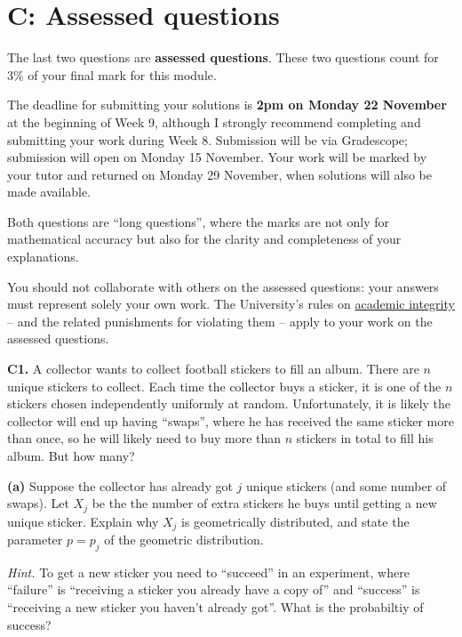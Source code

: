 \documentclass[
  a4paper,
]{book}
\theoremstyle{definition}
\theoremstyle{definition}
\theoremstyle{definition}
\theoremstyle{definition}
\theoremstyle{remark}
\begin{document}
\hypertarget{P4-assessed}{%
\section*{C: Assessed questions}\label{P4-assessed}}

The last two questions are \textbf{assessed questions}. These two questions count for 3\% of your final mark for this module.

The deadline for submitting your solutions is \textbf{2pm on Monday 22 November} at the beginning of Week 9, although I strongly recommend completing and submitting your work during Week 8. Submission will be via Gradescope; submission will open on Monday 15 November.
Your work will be marked by your tutor and returned on Monday 29 November, when solutions will also be made available.

Both questions are ``long questions'', where the marks are not only for mathematical accuracy but also for the clarity and completeness of your explanations.

You should not collaborate with others on the assessed questions: your answers must represent solely your own work. The University's rules on \href{https://library.leeds.ac.uk/info/1401/academic_skills/46/academic_integrity_and_plagiarism}{academic integrity} -- and the related punishments for violating them -- apply to your work on the assessed questions.

\textbf{C1.} A collector wants to collect football stickers to fill an album. There are \(n\) unique stickers to collect. Each time the collector buys a sticker, it is one of the \(n\) stickers chosen independently uniformly at random. Unfortunately, it is likely the collector will end up having ``swaps'', where he has received the same sticker more than once, so he will likely need to buy more than \(n\) stickers in total to fill his album. But how many?

\textbf{(a)} Suppose the collector has already got \(j\) unique stickers (and some number of swaps). Let \(X_j\) be the the number of extra stickers he buys until getting a new unique sticker. Explain why \(X_j\) is geometrically distributed, and state the parameter \(p = p_j\) of the geometric distribution.

\begin{myanswers}
\emph{Hint.} To get a new sticker you need to ``succeed'' in an experiment, where ``failure'' is ``receiving a sticker you already have a copy of'' and ``success'' is ``receiving a new sticker you haven't already got''. What is the probabiltiy of success?

\end{myanswers}
\end{document}
